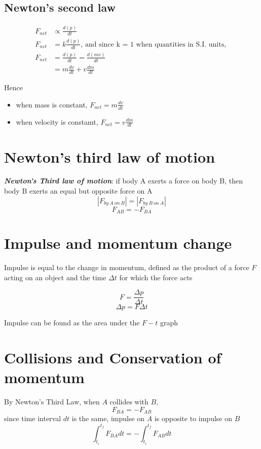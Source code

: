 \documentclass[a4paper, 10pt]{article}
\begin{document}
\subsection{Newton's second law}
\begin{align*}
   F_{net} &\propto \frac{d(p)}{dt} \\
   F_{net} &= k\frac{d(p)}{dt} \text{, and since k = 1 when quantities in S.I. units, } \\
   F_{net} &=  \frac{d(p)}{dt} = \frac{d(mv)}{dt} \\
           &= m\frac{dv}{dt} + v\frac{dm}{dt} 
\end{align*}	

Hence 
\begin{itemize}
   \item when mass is constant, $F_{net} = m\frac{dv}{dt}$ 
   \item when velocity is constamt, $F_{net} = v\frac{dm}{dt}$ 
\end{itemize}

\section{Newton's third law of motion}
\begin{framed}
   \textbf{\textit{Newton's Third law of motion}}: if body A exerts a force on body B, then body B exerts an equal but opposite force on A 
   \[
      |F_{by\  A\  on\  B}| = |F_{by\  B\  on\  A}|
   \]
   \[
      F_{AB} = -F_{BA}
   \]
\end{framed}	

\section{Impulse and momentum change}
Impulse is equal to the change in momentum, defined as the product of a force $F$ acting on an object and the time $\Delta t$ for which the force acts

\[
   F = \frac{\Delta p}{\Delta t}
\]
\[
\Delta p = F \Delta t
\]

Impulse can be found as the area under the $F-t$ graph
\section{Collisions and Conservation of momentum}
By Newton's Third Law, when $A$ collides with $B$, 
\[
F_{BA} = -F_{AB}  
\]
since time interval $dt$ is the same, impulse on $A$ is opposite to impulse on $B$ 
\[
   \int_{t_i}^{t_f} F_{BA} dt = - \int_{t_i}^{t_f} F_{AB} dt
\]
\end{document}
